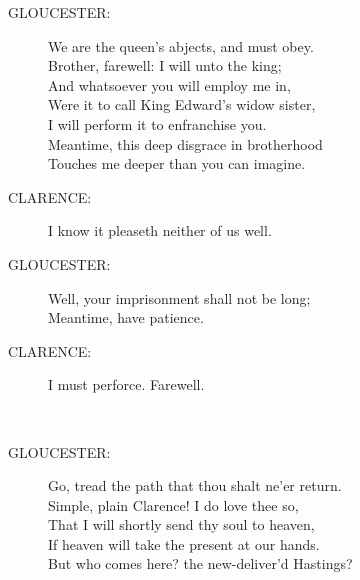 \documentclass{article}
\begin{document}
\begin{description}
\item[GLOUCESTER:] 
\hspace{1pt}We are the queen's abjects, and must obey.\\
\hspace{1pt}Brother, farewell: I will unto the king;\\
\hspace{1pt}And whatsoever you will employ me in,\\
\hspace{1pt}Were it to call King Edward's widow sister,\\
\hspace{1pt}I will perform it to enfranchise you.\\
\hspace{1pt}Meantime, this deep disgrace in brotherhood\\
\hspace{1pt}Touches me deeper than you can imagine.\\
\end{description}
\begin{description}
\item[CLARENCE:] 
\hspace{1pt}I know it pleaseth neither of us well.\\
\end{description}
\begin{description}
\item[GLOUCESTER:] 
\hspace{1pt}Well, your imprisonment shall not be long;\\
\hspace{1pt}Meantime, have patience.\\
\end{description}
\begin{description}
\item[CLARENCE:] 
\hspace{1pt}I must perforce. Farewell.\\
\end{description}
\\
\begin{description}
\item[GLOUCESTER:] 
\hspace{1pt}Go, tread the path that thou shalt ne'er return.\\
\hspace{1pt}Simple, plain Clarence! I do love thee so,\\
\hspace{1pt}That I will shortly send thy soul to heaven,\\
\hspace{1pt}If heaven will take the present at our hands.\\
\hspace{1pt}But who comes here? the new-deliver'd Hastings?\\
\end{description}
\end{document}
